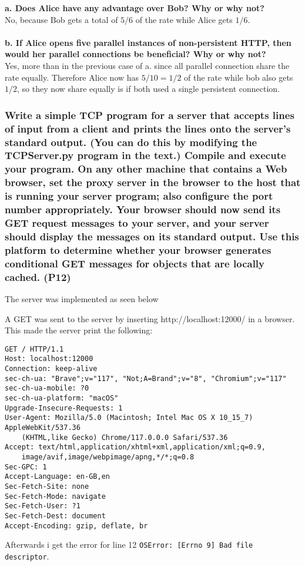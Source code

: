 \textbf{a. Does Alice have any advantage over Bob? Why or why not?} \\
No, because Bob gets a total of $5/6$ of the rate while Alice gets $1/6$. \\
\\
\textbf{b. If Alice opens five parallel instances of non-persistent HTTP, then would her parallel connections be beneficial? Why or why not?} \\
Yes, more than in the previous case of a. since all parallel connection share the rate equally. Therefore Alice now has $5/10 = 1/2$ of the rate while bob also gets $1/2$, so they now share equally is if both used a single persistent connection.


\subsubsection{Write a simple TCP program for a server that accepts lines of input from a client and prints the lines onto the server's standard output. (You can do this by modifying the TCPServer.py program in the text.) Compile and execute your
program. On any other machine that contains a Web browser, set the proxy server in the browser to the host that is running your server program; also configure the port number appropriately. Your browser should now send its GET request messages to your server, and your server should display the messages on its standard output. Use this platform to determine whether your browser generates conditional GET messages for objects that are locally cached. (P12)}

The server was implemented as seen below

A GET was sent to the server by inserting http://localhost:12000/ in a browser. This made the server print the following:
\begin{verbatim}
GET / HTTP/1.1
Host: localhost:12000
Connection: keep-alive
sec-ch-ua: "Brave";v="117", "Not;A=Brand";v="8", "Chromium";v="117"
sec-ch-ua-mobile: ?0
sec-ch-ua-platform: "macOS"
Upgrade-Insecure-Requests: 1
User-Agent: Mozilla/5.0 (Macintosh; Intel Mac OS X 10_15_7) AppleWebKit/537.36 
    (KHTML,like Gecko) Chrome/117.0.0.0 Safari/537.36
Accept: text/html,application/xhtml+xml,application/xml;q=0.9,
    image/avif,image/webpimage/apng,*/*;q=0.8
Sec-GPC: 1
Accept-Language: en-GB,en
Sec-Fetch-Site: none
Sec-Fetch-Mode: navigate
Sec-Fetch-User: ?1
Sec-Fetch-Dest: document
Accept-Encoding: gzip, deflate, br
\end{verbatim}
Afterwards i get the error for line 12 \texttt{OSError: [Errno 9] Bad file descriptor}.



